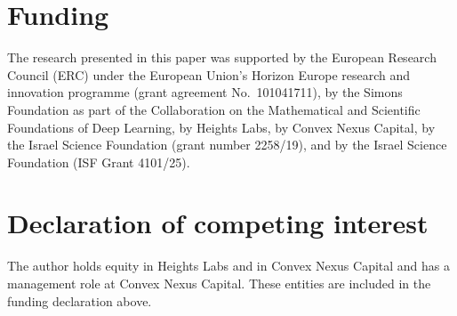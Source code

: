 \documentclass[11pt]{amsart}
\theoremstyle{definition}
\begin{document}
\section*{Funding}
The research presented in this paper was supported by the European Research Council (ERC) under the European Union's Horizon Europe research and innovation programme (grant agreement No.~101041711), by the Simons Foundation as part of the Collaboration on the Mathematical and Scientific Foundations of Deep Learning, by Heights Labs, by Convex Nexus Capital, by the Israel Science Foundation (grant number 2258/19), and by the Israel Science Foundation (ISF Grant 4101/25).

\section*{Declaration of competing interest}
The author holds equity in Heights Labs and in Convex Nexus Capital and has a management role at Convex Nexus Capital. These entities are included in the funding declaration above.
\end{document}
